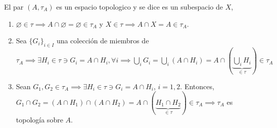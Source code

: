 \begin{definicion}
    El par $(A,\tau_A)$ es un espacio topologico y se dice es un subespacio de $X$, 
    \begin{enumerate}
        \item $\varnothing\in \tau\implies A\cap \varnothing=\varnothing\in\tau_A$ y $X\in \tau\implies A\cap X=A\in \tau_A$.
        \item Sea $\{G_i\}_{i\in I}$ una colección de miembros de $\tau_A\implies \exists H_i\in \tau\ni G_i=A\cap H_i, \forall i\implies \bigcup_i G_i=\bigcup_i(A\cap H_i)= A\cap\left(\underbrace{\bigcup_{i}H_i}_{\in\tau}\right)\in\tau_A$
        \item Sean $G_1,G_2\in \tau_A\implies\exists H_i\in\tau\ni G_i=A\cap H_i$, $i=1,2$. Entonces, $G_1\cap G_2=(A\cap H_1)\cap (A\cap H_2)=A\cap (\underbrace{H_1\cap H_2}_{\in\tau})\in\tau_A\implies \tau_A$ es topología sobre $A$. 
    \end{enumerate}
\end{definicion}

